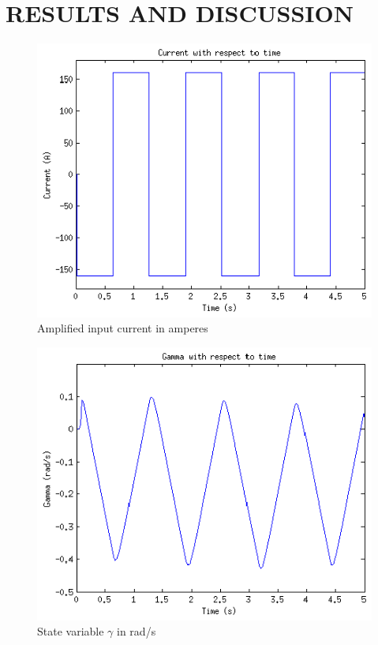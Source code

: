 \documentclass[twocolumn,10pt]{asme2e}
\begin{document}
\section*{RESULTS AND DISCUSSION}

\begin{figure}
\begin{center}
\includegraphics{figs/fig_ss_current.eps}
\caption{Amplified input current in amperes}
\label{figs/fig_ss_current}
\end{center}
\end{figure}

\begin{figure}
\begin{center}
\includegraphics{figs/fig_ss_gamma.eps}
\caption{State variable $\gamma$ in rad/s}
\label{figs/fig_ss_gamma}
\end{center}
\end{figure}
\end{document}
